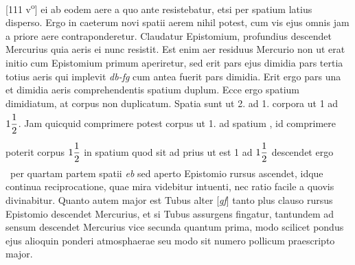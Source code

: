                      [111 v\textsuperscript{o}] ei ab eodem aere a quo ante resistebatur, etsi per spatium latius disperso. Ergo in caeterum novi spatii aerem nihil potest, cum vis ejus omnis jam a priore aere contraponderetur. Claudatur Epistomium\protect{}, profundius descendet Mercurius\protect{} quia  aeris ei nunc resistit. Est enim  aer residuus  Mercurio\protect{} non  ut erat initio cum Epistomium\protect{} primum aperiretur, sed erit pars ejus dimidia  pars tertia totius aeris qui implevit \textit{db-fg} cum antea fuerit pars dimidia. Erit ergo pars una et dimidia aeris comprehendentis spatium duplum. Ecce ergo spatium dimidiatum, at corpus non duplicatum. Spatia sunt ut 2. ad 1. corpora ut 1 ad $\rule[-4mm]{0mm}{10mm}1\displaystyle\frac{1}{2}$. Jam quicquid comprimere potest corpus ut 1. ad spatium , id comprimere poterit corpus $\rule[-4mm]{0mm}{10mm}1\displaystyle\frac{1}{2}$ in spatium quod sit ad prius ut est 1 ad $\rule[-4mm]{0mm}{10mm}1\displaystyle\frac{1}{2}$ descendet ergo \mercury\ per quartam partem spatii \textit{eb} sed aperto Epistomio\protect{} rursus ascendet, idque continua reciprocatione, quae mira videbitur intuenti, nec ratio facile a quovis divinabitur. Quanto autem major est Tubus alter [\textit{gf}]  tanto plus clauso rursus Epistomio\protect{} descendet Mercurius\protect{}, et si Tubus %
 assurgens fingatur, tantundem ad sensum descendet Mercurius\protect{} vice secunda quantum prima, modo scilicet pondus\protect{} ejus alioquin ponderi atmosphaerae  seu modo sit numero pollicum praescripto major.
\pend